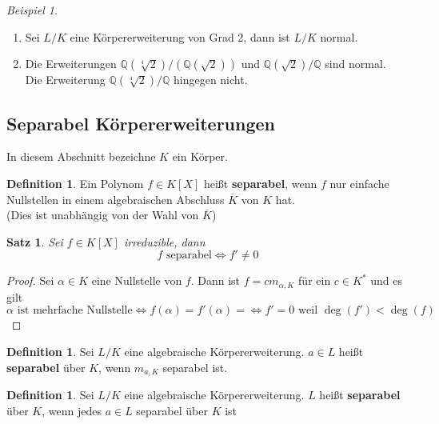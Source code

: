 \documentclass[10pt,a4paper]{article}
\newcommand{\Q}{\ensuremath{\mathbb{Q}}}
\newcommand{\al}{\ensuremath{\alpha}}
\newcommand{\ol}[1]{\overline{#1}}
\theoremstyle{plain}
\newtheorem{satz}[theorem]{Satz}
\theoremstyle{definition}
\newtheorem{definition}[theorem]{Definition}
\theoremstyle{remark}
\newtheorem{exm}[theorem]{Beispiel}
\begin{document}
	\begin{exm}
		\begin{enumerate}
			\item Sei $L/K$ eine Körpererweiterung von Grad 2, dann ist $L/K$ normal.
			\item Die Erweiterungen $\Q(\sqrt[4]{2})/(\Q(\sqrt{2}))$ und $\Q(\sqrt{2})/\Q$ sind normal.\\
			Die Erweiterung $\Q(\sqrt[4]{2})/\Q$ hingegen nicht.
		\end{enumerate}
	\end{exm}


\subsection{Separabel Körpererweiterungen}
In diesem Abschnitt bezeichne $K$ ein Körper.

	\begin{definition}
		Ein Polynom $f\in K[X]$ heißt \textbf{separabel}, wenn $f$ nur einfache Nullstellen in einem algebraischen Abschluss $\ol K$ von $K$ hat.\\
		(Dies ist unabhängig von der Wahl von $\ol K$)
	\end{definition}

	\begin{satz}
		Sei $f\in K[X]$ irreduzible, dann
		\[\text{$f$ separabel}\Leftrightarrow f'\neq 0\]
	\end{satz}
	\begin{proof}
		Sei $\al\in K$ eine Nullstelle von $f$. Dann ist $f=cm_{\al,K}$ für ein $c\in K^*$ und  es gilt
		\[\text{$\al$ ist mehrfache Nullstelle}\Leftrightarrow f(\al)=f'(\al)=\Leftrightarrow \text{$f'=0$ weil $\deg(f')<\deg(f)$}\]
	\end{proof}

	\begin{definition}
		Sei $L/K$ eine algebraische Körpererweiterung. $a\in L$ heißt \textbf{separabel} über $K$, wenn $m_{a,K}$ separabel ist.
	\end{definition}

	\begin{definition}
		Sei $L/K$ eine algebraische Körpererweiterung. $L$ heißt \textbf{separabel} über $K$, wenn jedes $a\in L$ separabel über $K$ ist
	\end{definition}
\end{document}
